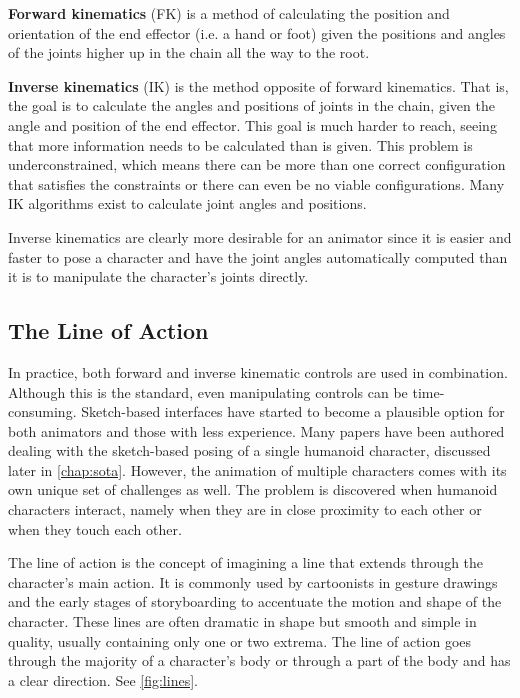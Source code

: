\textbf{Forward kinematics} (FK) is a method of calculating the position and orientation of the end effector (i.e. a hand or foot) given the positions and angles of the joints higher up in the chain all the way to the root. 

\textbf{Inverse kinematics} (IK) is the method opposite of forward kinematics. That is, the goal is to calculate the angles and positions of joints in the chain, given the angle and position of the end effector. This goal is much harder to reach, seeing that more information needs to be calculated than is given. This problem is underconstrained, which means there can be more than one correct configuration that satisfies the constraints or there can even be no viable configurations. Many IK algorithms exist to calculate joint angles and positions.

Inverse kinematics are clearly more desirable for an animator since it is easier and faster to pose a character and have the joint angles automatically computed than it is to manipulate the character's joints directly.

\subsection{The Line of Action}
In practice, both forward and inverse kinematic controls are used in combination. Although this is the standard, even manipulating controls can be time-consuming. Sketch-based interfaces have started to become a plausible option for both animators and those with less experience. Many papers have been authored dealing with the sketch-based posing of a single humanoid character, discussed later in \autoref{chap:sota}. However, the animation of multiple characters comes with its own unique set of challenges as well. The problem is discovered when humanoid characters interact, namely when they are in close proximity to each other or when they touch each other.

The  line of action is the concept of imagining a line that extends through the character's main action. It is commonly used by cartoonists in gesture drawings and the early stages of storyboarding to accentuate the motion and shape of the character. These lines are often dramatic in shape but smooth and simple in quality, usually containing only one or two extrema. The line of action goes through the majority of a character's body or through a part of the body and has a clear direction. See \autoref{fig:lines}.

